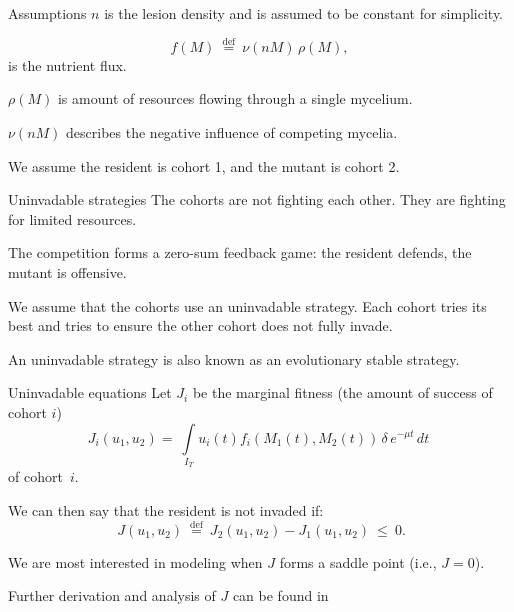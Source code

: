 \documentclass{beamer}
\begin{document}
\begin{frame}{Assumptions}
    $n$ is the lesion density and is assumed to be constant for simplicity. \newline
    
    $$
    f(M) \: \stackrel{\mathrm{def}}{=} \: \nu(n M) \, \rho(M),
    $$
    is the nutrient flux. \newline
    
    $\rho(M)$ is amount of resources flowing through a single mycelium.
    
    $ \nu(n M) $ describes the negative influence of competing mycelia. \newline
    
    We assume the resident is cohort 1, and the mutant is cohort 2.
\end{frame}

\begin{frame}{Uninvadable strategies}
    The cohorts are not fighting each other. They are fighting for limited resources. \newline
    
    The competition forms a zero-sum feedback game: the resident defends, the mutant is offensive. \newline
    
    We assume that the cohorts use an uninvadable strategy. Each cohort tries its best and tries to ensure the other cohort does not fully invade. \newline
    
    An uninvadable strategy is also known as an evolutionary stable strategy.
\end{frame}


\begin{frame}{Uninvadable equations}
    Let $ J_i $ be the marginal fitness (the amount of success of cohort $i$)
    $$J_i(u_1, u_2) = \: \int\limits_{I_T} u_i(t) f_i(M_1(t), M_2(t)) \, \delta \, e^{-\mu t} \, dt \: $$ of cohort~$ i $. \newline
    
    We can then say that the resident is not invaded if: $$ \: J(u_1, u_2) \: \stackrel{\mathrm{def}}{=} \: J_2(u_1, u_2) - J_1(u_1, u_2) \: \leqslant \: 0. $$ 
    
    We are most interested in modeling when $J$ forms a saddle point (i.e., $J = 0$).\newline
    
    Further derivation and analysis of $J$ can be found in \cite{YegorovGrognardMailleretHalkettBernhard2019}
    
\end{frame}
\end{document}
